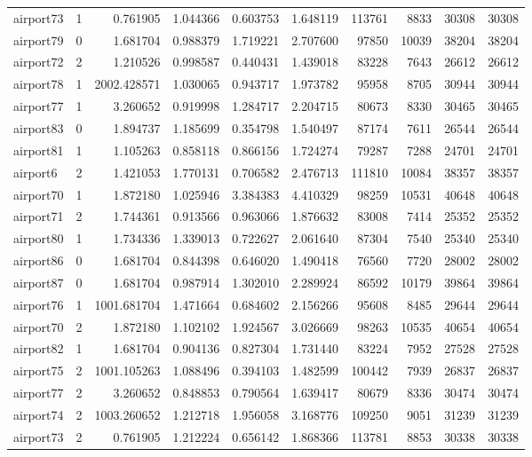 \begin{longtable}{|l|r|r|r|r|r|r|r|r|r|}
airport73 & 1 & 0.761905 & 1.044366 & 0.603753 & 1.648119 & 113761 & 8833 & 30308 & 30308 \\
airport79 & 0 & 1.681704 & 0.988379 & 1.719221 & 2.707600 & 97850 & 10039 & 38204 & 38204 \\
airport72 & 2 & 1.210526 & 0.998587 & 0.440431 & 1.439018 & 83228 & 7643 & 26612 & 26612 \\
airport78 & 1 & 2002.428571 & 1.030065 & 0.943717 & 1.973782 & 95958 & 8705 & 30944 & 30944 \\
airport77 & 1 & 3.260652 & 0.919998 & 1.284717 & 2.204715 & 80673 & 8330 & 30465 & 30465 \\
airport83 & 0 & 1.894737 & 1.185699 & 0.354798 & 1.540497 & 87174 & 7611 & 26544 & 26544 \\
airport81 & 1 & 1.105263 & 0.858118 & 0.866156 & 1.724274 & 79287 & 7288 & 24701 & 24701 \\
airport6 & 2 & 1.421053 & 1.770131 & 0.706582 & 2.476713 & 111810 & 10084 & 38357 & 38357 \\
airport70 & 1 & 1.872180 & 1.025946 & 3.384383 & 4.410329 & 98259 & 10531 & 40648 & 40648 \\
airport71 & 2 & 1.744361 & 0.913566 & 0.963066 & 1.876632 & 83008 & 7414 & 25352 & 25352 \\
airport80 & 1 & 1.734336 & 1.339013 & 0.722627 & 2.061640 & 87304 & 7540 & 25340 & 25340 \\
airport86 & 0 & 1.681704 & 0.844398 & 0.646020 & 1.490418 & 76560 & 7720 & 28002 & 28002 \\
airport87 & 0 & 1.681704 & 0.987914 & 1.302010 & 2.289924 & 86592 & 10179 & 39864 & 39864 \\
airport76 & 1 & 1001.681704 & 1.471664 & 0.684602 & 2.156266 & 95608 & 8485 & 29644 & 29644 \\
airport70 & 2 & 1.872180 & 1.102102 & 1.924567 & 3.026669 & 98263 & 10535 & 40654 & 40654 \\
airport82 & 1 & 1.681704 & 0.904136 & 0.827304 & 1.731440 & 83224 & 7952 & 27528 & 27528 \\
airport75 & 2 & 1001.105263 & 1.088496 & 0.394103 & 1.482599 & 100442 & 7939 & 26837 & 26837 \\
airport77 & 2 & 3.260652 & 0.848853 & 0.790564 & 1.639417 & 80679 & 8336 & 30474 & 30474 \\
airport74 & 2 & 1003.260652 & 1.212718 & 1.956058 & 3.168776 & 109250 & 9051 & 31239 & 31239 \\
airport73 & 2 & 0.761905 & 1.212224 & 0.656142 & 1.868366 & 113781 & 8853 & 30338 & 30338 \\

\end{longtable}
